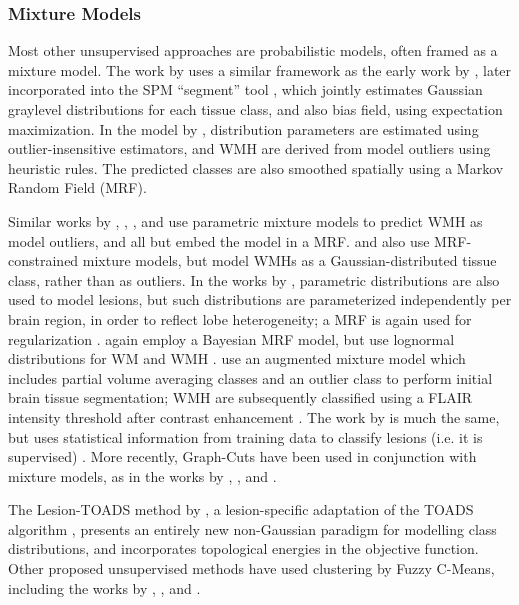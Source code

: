 \subsubsection{Mixture Models}
Most other unsupervised approaches are probabilistic models, often framed as a mixture model.
The work by \citeauthor{VanLeemput2001} \cite{VanLeemput2001} uses a similar framework as the early work by \citeauthor{Ashburner1997} \cite{Ashburner1997}, later incorporated into the SPM ``segment'' tool \cite{Ashburner2005}, which jointly estimates Gaussian graylevel distributions for each tissue class, and also bias field, using expectation maximization. In the model by \citeauthor{VanLeemput2001}, distribution parameters are estimated using outlier-insensitive estimators, and WMH are derived from model outliers using heuristic rules. The predicted classes are also smoothed spatially using a Markov Random Field (MRF).
\par
Similar works by \citeauthor{Bricq2008} \cite{Bricq2008}, \citeauthor{Schmidt2012} \cite{Schmidt2012}, \citeauthor{Jain2015} \cite{Jain2015}, and \citeauthor{Roura2015} \cite{Roura2015} use parametric mixture models to predict WMH as model outliers, and all but \cite{Roura2015} embed the model in a MRF.
\citeauthor{Khayati2008} \cite{Khayati2008} and \citeauthor{Subbanna2009} \cite{Subbanna2009} also use MRF-constrained mixture models, but model WMHs as a Gaussian-distributed tissue class, rather than as outliers.
In the works by \citeauthor{Harmouche2006}, parametric distributions are also used to model lesions, but such distributions are parameterized independently per brain region, in order to reflect lobe heterogeneity; a MRF is again used for regularization \cite{Harmouche2006,Harmouche2015}.
\citeauthor{Schwarz2009} again employ a Bayesian MRF model, but use lognormal distributions for WM and WMH \cite{Schwarz2009}.
\citeauthor{Souplet2008} use an augmented mixture model which includes partial volume averaging classes and an outlier class to perform initial brain tissue segmentation; WMH are subsequently classified using a FLAIR intensity threshold after contrast enhancement \cite{Souplet2008}. 
The work by \citeauthor{Herskovits2008} is much the same, but uses statistical information from training data to classify lesions (i.e. it is supervised) \cite{Herskovits2008}.
More recently, Graph-Cuts have been used in conjunction with mixture models, as in the works by \citeauthor{Garcia-Lorenzo2009} \cite{Garcia-Lorenzo2009}, \citeauthor{Tomas-Fernandez2015} \cite{Tomas-Fernandez2015}, and \citeauthor{Strumia2016} \cite{Strumia2016}.
\par
The Lesion-TOADS method by \citeauthor{Shiee2010} \cite{Shiee2010}, a lesion-specific adaptation of the TOADS algorithm \cite{Bazin2008}, presents an entirely new non-Gaussian paradigm for modelling class distributions, and incorporates topological energies in the objective function.
Other proposed unsupervised methods have used clustering by Fuzzy C-Means, including the works by \citeauthor{Admiraal-Behloul2005} \cite{Admiraal-Behloul2005}, \citeauthor{Gibson2010} \cite{Gibson2010}, and \citeauthor{Valverde2016} \cite{Valverde2016}.
